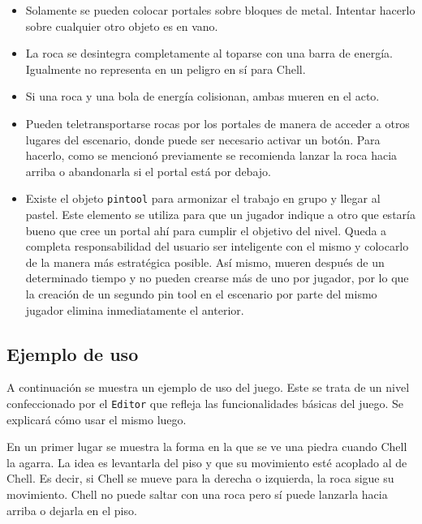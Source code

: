 \documentclass[a4paper]{article}
\begin{document}
\begin{itemize}
	\item Solamente se pueden colocar portales sobre bloques de metal. Intentar hacerlo sobre cualquier otro objeto es en vano.
	
	\item La roca se desintegra completamente al toparse con una barra de energía. Igualmente no representa en un peligro en sí para Chell.
	
	\item Si una roca y una bola de energía colisionan, ambas mueren en el acto.
	
	\item Pueden teletransportarse rocas por los portales de manera de acceder a otros lugares del escenario, donde puede ser necesario activar un botón. Para hacerlo, como se mencionó previamente se recomienda lanzar la roca hacia arriba o abandonarla si el portal está por debajo.
	
	\item Existe el objeto \texttt{pintool} para armonizar el trabajo en grupo y llegar al pastel. Este elemento se utiliza para que un jugador indique a otro que estaría bueno que cree un portal ahí para cumplir el objetivo del nivel. Queda a completa responsabilidad del usuario ser inteligente con el mismo y colocarlo de la manera más estratégica posible. Así mismo, mueren después de un determinado tiempo y no pueden crearse más de uno por jugador, por lo que la creación de un segundo pin tool en el escenario por parte del mismo jugador elimina inmediatamente el anterior.
\end{itemize}

\subsection{Ejemplo de uso}

A continuación se muestra un ejemplo de uso del juego. Este se trata de un nivel confeccionado por el \texttt{Editor} que refleja las funcionalidades básicas del juego. Se explicará cómo usar el mismo luego.

En un primer lugar se muestra la forma en la que se ve una piedra cuando Chell la agarra. La idea es levantarla del piso y que su movimiento esté acoplado al de Chell. Es decir, si Chell se mueve para la derecha o izquierda, la roca sigue su movimiento. Chell no puede saltar con una roca pero sí puede lanzarla hacia arriba o dejarla en el piso.
\end{document}
